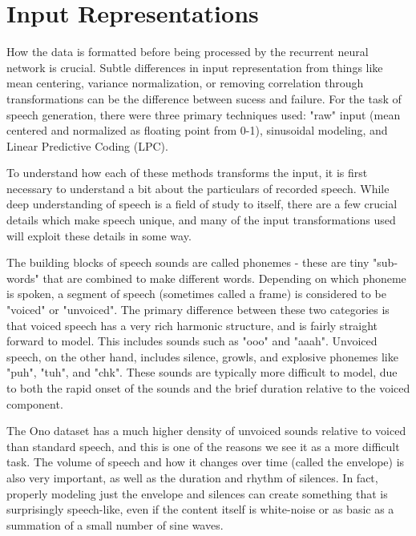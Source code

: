\documentclass{article} %
\begin{document}
\section{Input Representations}
How the data is formatted before being processed by the recurrent neural
network is crucial. Subtle differences in input representation from things
like mean centering, variance normalization, or removing correlation 
through transformations can be the difference between sucess and failure. For
the task of speech generation, there were three primary techniques
used: "raw" input (mean centered and normalized as floating point from 0-1),
sinusoidal modeling, and Linear Predictive Coding (LPC).
\par
To understand how each of these methods transforms the input, it is first
necessary to understand a bit about the particulars of recorded speech. While
deep understanding of speech is a field of study to itself, there are a few
crucial details which make speech unique, and many of the input 
transformations used will exploit these details in some way.
\par
The building blocks of speech sounds are called phonemes - these are tiny
"sub-words" that are combined to make different words. Depending on which
phoneme is spoken, a segment of speech (sometimes called a frame) is considered
to be "voiced" or "unvoiced". The primary difference between these two
categories is that voiced speech has a very rich harmonic structure,
and is fairly straight forward to model. This includes sounds such as
"ooo" and "aaah". Unvoiced speech, on the other hand, includes silence,
growls, and explosive phonemes like "puh", "tuh", and "chk". These sounds
are typically more difficult to model, due to both the rapid onset of the
sounds and the brief duration relative to the voiced component. 
\par
The Ono
dataset has a much higher density of unvoiced sounds relative to voiced than
standard speech, and this is one of the reasons we see it as a more
difficult task. The volume of speech and how it changes over time (called the
envelope) is also very important, as well as the duration and rhythm of
silences. In fact, properly modeling just the envelope and silences can
create something that is surprisingly speech-like, even if the content
itself is white-noise or as basic as a summation of a small number
of sine waves.
\end{document}

